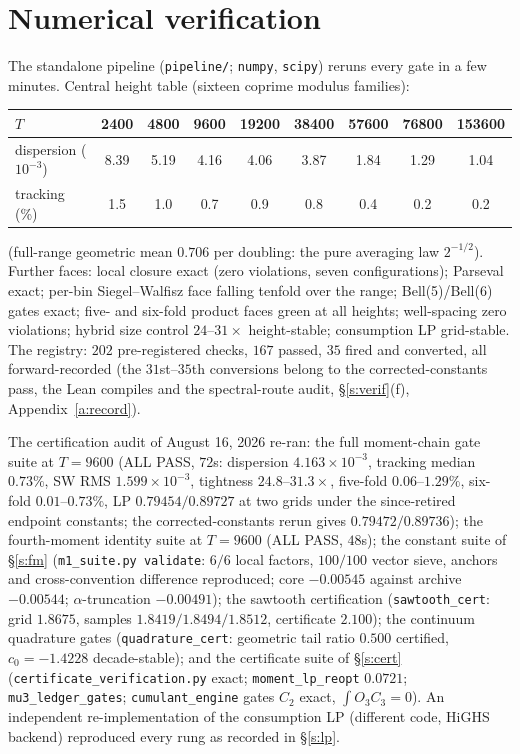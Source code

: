 \documentclass[11pt]{article}
\numberwithin{equation}{section}
\theoremstyle{definition}
\theoremstyle{remark}
\begin{document}
\section{Numerical verification}\label{s:faces}

The standalone pipeline (\texttt{pipeline/}; \texttt{numpy},
\texttt{scipy}) reruns every gate in a few minutes. Central
height table (sixteen coprime modulus families):

\begin{center}
\begin{tabular}{lcccccccc}
$T$ & 2400 & 4800 & 9600 & 19200 & 38400 & 57600 & 76800 & 153600\\
\hline
dispersion ($10^{-3}$) & 8.39 & 5.19 & 4.16 & 4.06 & 3.87 & 1.84
& 1.29 & 1.04\\
tracking (\%) & 1.5 & 1.0 & 0.7 & 0.9 & 0.8 & 0.4 & 0.2 & 0.2\\
\end{tabular}
\end{center}

\noindent (full-range geometric mean $0.706$ per doubling: the
pure averaging law $2^{-1/2}$). Further faces: local closure
exact (zero violations, seven configurations); Parseval exact;
per-bin Siegel--Walfisz face falling tenfold over the range;
Bell(5)/Bell(6) gates exact; five- and six-fold product faces
green at all heights; well-spacing zero violations; hybrid size
control $24$--$31\times$ height-stable; consumption LP
grid-stable. The registry: $202$ pre-registered checks, $167$
passed, $35$ fired and converted, all forward-recorded (the
$31$st--$35$th conversions belong to the corrected-constants
pass, the Lean compiles and the spectral-route audit,
\S\ref{s:verif}(f), Appendix~\ref{a:record}).

The certification audit of August 16, 2026 re-ran: the full
moment-chain gate suite at $T=9600$ (ALL PASS, $72$s: dispersion $4.163\times
10^{-3}$, tracking median $0.73\%$, SW RMS $1.599\times10^{-3}$,
tightness $24.8$--$31.3\times$, five-fold $0.06$--$1.29\%$,
six-fold $0.01$--$0.73\%$, LP $0.79454/0.89727$ at two grids
under the since-retired endpoint constants; the
corrected-constants rerun gives $0.79472/0.89736$);
the fourth-moment identity suite at $T=9600$ (ALL PASS,
$48$s); the constant suite of \S\ref{s:fm}
(\texttt{m1\_suite.py validate}: $6/6$ local
factors, $100/100$ vector sieve, anchors and cross-convention
difference reproduced; core $-0.00545$ against archive
$-0.00544$; $\alpha$-truncation $-0.00491$); the sawtooth
certification (\texttt{sawtooth\_cert}: grid $1.8675$, samples
$1.8419/1.8494/1.8512$, certificate $2.100$); the continuum
quadrature gates (\texttt{quadrature\_cert}: geometric tail ratio $0.500$
certified, $c_0=-1.4228$ decade-stable); and the certificate
suite of \S\ref{s:cert}
(\texttt{certificate\_verification.py} exact;
\texttt{moment\_lp\_reopt} $0.0721$; \texttt{mu3\_ledger\_gates};
\texttt{cumulant\_engine} gates $C_2$ exact,
$\int O_3C_3=0$). An independent re-implementation of the
consumption LP (different code, HiGHS backend) reproduced every
rung as recorded in \S\ref{s:lp}.
\end{document}
